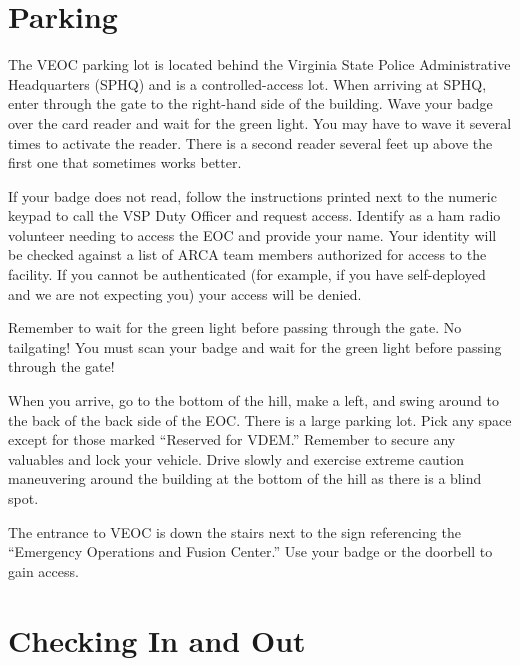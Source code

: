 \documentclass[pdflatex,letterpaper,twoside,12pt]{book}
\begin{document}

\section{Parking}

The VEOC parking lot is located behind the Virginia State Police Administrative Headquarters (SPHQ) and is a controlled-access lot.  When arriving at SPHQ, enter through the gate to the right-hand side of the building.  Wave your badge over the card reader and wait for the green light.  You may have to wave it several times to activate the reader.  There is a second reader several feet up above the first one that sometimes works better.

If your badge does not read, follow the instructions printed next to the numeric keypad to call the VSP Duty Officer and request access.  Identify as a ham radio volunteer needing to access the EOC and provide your name.  Your identity will be checked against a list of ARCA team members authorized for access to the facility.  If you cannot be authenticated (for example, if you have self-deployed and we are not expecting you) your access will be denied.

Remember to wait for the green light before passing through the gate.  No tailgating!  You must scan your badge and wait for the green light before passing through the gate!

When you arrive, go to the bottom of the hill, make a left, and swing around to the back of the back side of the EOC.  There is a large parking lot.  Pick any space except for those marked “Reserved for VDEM.”  Remember to secure any valuables and lock your vehicle.  Drive slowly and exercise extreme caution maneuvering around the building at the bottom of the hill as there is a blind spot.

The entrance to VEOC is down the stairs next to the sign referencing the ``Emergency Operations and Fusion Center.''  Use your badge or the doorbell to gain access.


\section{Checking In and Out}
\end{document}
